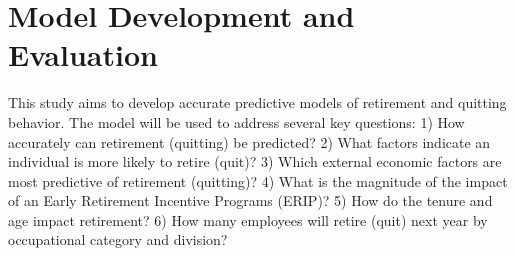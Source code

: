 \documentclass[12pt,letterpaper]{article}
\begin{document}

\section{Model Development and Evaluation}
This study aims to develop accurate predictive models of retirement and quitting behavior. The model will be used to address several key questions:
1) How accurately can retirement (quitting) be predicted?
2) What factors indicate an individual is more likely to retire (quit)?
3) Which external economic factors are most predictive of retirement (quitting)?
4) What is the magnitude of the impact of an Early Retirement Incentive Programs (ERIP)?
5) How do the tenure and age impact retirement?
6) How many employees will retire (quit) next year by occupational category and division?
\end{document}
